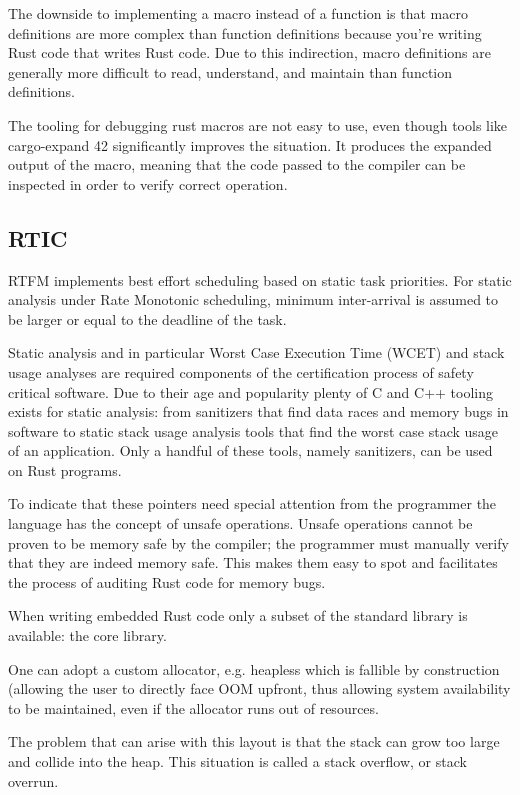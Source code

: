 \documentclass{ieeeaccess}
\begin{document}
The downside to implementing a macro instead of a function is that macro definitions are more complex than function definitions because you're writing Rust code that writes Rust code. Due to this indirection, macro definitions are generally more difficult to read, understand, and maintain than function definitions.

The tooling for debugging rust macros are not easy to use, even though tools like cargo-expand 42 significantly improves the situation. It produces the expanded output of the macro, meaning that the code passed to the compiler can be inspected in order to verify correct operation.

\subsection{RTIC}

RTFM implements best effort scheduling based on static task priorities. For static analysis under Rate Monotonic scheduling, minimum inter-arrival is assumed to be larger or equal to the deadline of the task.

Static analysis and in particular Worst Case Execution Time (WCET) and stack usage analyses are required components of the certification process of safety critical software. Due to their age and popularity plenty of C and C++ tooling exists for static analysis: from sanitizers that find data races and memory bugs in software to static stack usage analysis tools that find the worst case stack usage of an application. Only a handful of these tools, namely sanitizers, can be used on Rust programs.

To indicate that these pointers need special attention from the programmer the language has the concept of unsafe operations. Unsafe operations cannot be proven to be memory safe by the compiler; the programmer must manually verify that they are indeed memory safe. This makes them easy to spot and facilitates the process of auditing Rust code for memory bugs.

When writing embedded Rust code only a subset of the standard library is available: the core library.

One can adopt a custom allocator, e.g. heapless which is fallible by construction (allowing the user to directly face OOM upfront, thus allowing system availability to be maintained, even if the allocator runs out of resources.

The problem that can arise with this layout is that the stack can grow too large and collide into the heap. This situation is called a stack overflow, or stack overrun.
\end{document}
